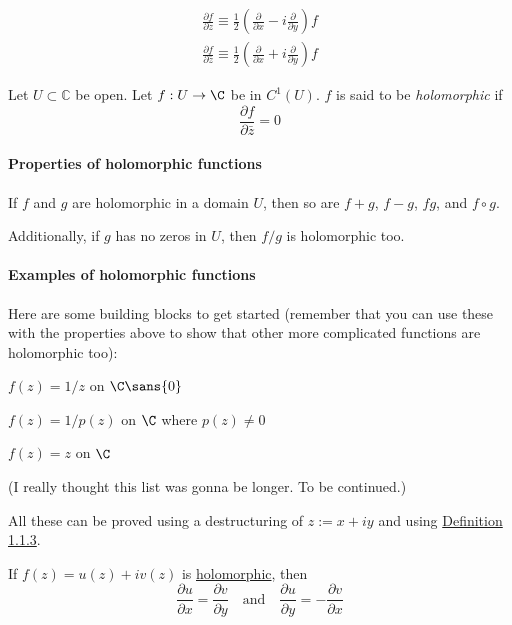 \begin{gather*}
  \frac{\partial f}{\partial z}\equiv\frac12\left(\frac{\partial}{\partial x}-i\frac{\partial}{\partial y}\right)f \\[1em]
  \frac{\partial f}{\partial\bar z}\equiv\frac12\left(\frac{\partial}{\partial x}+i\frac{\partial}{\partial y}\right)f
\end{gather*}

\label{e1e08f7}

Let $U\subset\mathbb C$ be open. Let $f:U\to\C$ be in $C^1(U)$. $f$ is said to
be \textit{holomorphic} if
$$
  \frac{\partial f}{\partial\bar z}=0
$$

\paragraph{Properties of holomorphic functions} If $f$ and $g$ are holomorphic in a domain $U$, then so are $f+g$, $f-g$, $fg$,
and $f\circ g$.

Additionally, if $g$ has no zeros in $U$, then $f/g$ is holomorphic too.

\paragraph{Examples of holomorphic functions}

Here are some building blocks to get started (remember that you can use these
with the properties above to show that other more complicated functions are
holomorphic too):

\begin{enumerati}
  \item $f(z)=1/z$ on $\C\sans{0}$
  \item $f(z)=1/p(z)$ on $\C$ where $p(z)\neq0$
  \item $f(z)=z$ on $\C$
\end{enumerati}

(I really thought this list was gonna be longer. To be continued.)

All these can be proved using a destructuring of $z:=x+iy$ and using
\href{ffea0ed}{Definition 1.1.3}.

\label{fb10fd3}

If $f(z) = u(z) + iv(z)$ is \href{e1e08f7}{holomorphic}, then
$$
  \frac{\partial u}{\partial x}=\frac{\partial v}{\partial y}
  \quad\text{and}\quad
  \frac{\partial u}{\partial y}=-\frac{\partial v}{\partial x}
$$

